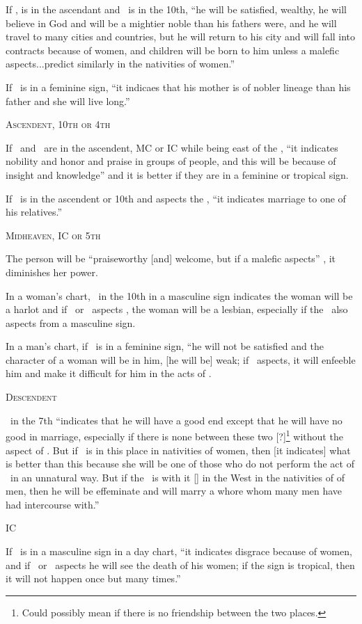 If \Venus, is in the ascendant and \Saturn\, is in the 10th, ``he will be satisfied, wealthy, he will believe in God and will be a mightier noble than his fathers were, and he will travel to many cities and countries, but he will return to his city and will fall into contracts because of women, and children will be born to him unless a malefic aspects...predict similarly in the nativities of women.''

If \Venus\,  is in a feminine sign, ``it indicaes that his mother is of nobler lineage than his father and she will live long.''

\noindent\textsc{Ascendent, 10th or 4th}

If \Venus\, and \Mercury\, are in the ascendent, MC or IC while being east of the \Sun, ``it indicates nobility and honor and praise in groups of people, and this will be because of insight and knowledge'' and it is better if they are in a feminine or tropical sign.

If \Venus\, is in the ascendent or 10th and aspects the \Moon, ``it indicates marriage to one of his relatives.''

\noindent\textsc{Midheaven, IC or 5th}

The person will be ``praiseworthy [and] welcome, but if a malefic aspects'' \Venus, it diminishes her power.

In a woman's chart, \Venus\, in the 10th in a masculine sign indicates the woman will be a harlot and if \Mars\, or \Mercury\, aspects \Venus, the woman will be a lesbian, especially if the \Moon\, also aspects from a masculine sign.

In a man's chart, if \Venus\, is in a feminine sign, ``he will not be satisfied and the character of a woman will be in him, [he will be] weak; if \Saturn\, aspects, it will enfeeble him and make it difficult for him in the acts of \Venus.

\noindent\textsc{Descendent}

\Venus\, in the 7th ``indicates that he will have a good end except that he will have no good in marriage, especially if there is none between these two [?]\footnote{Could possibly mean if there is no friendship between the two places.} without the aspect of \Jupiter. But if \Venus\, is in this place in nativities of women, then [it indicates] what is better than this because she will be one of those who do not perform the act of \Venus\, in an unnatural way. But if the \Moon\, is with it [\Venus] in the West in the nativities of of men, then he will be effeminate and will marry a whore whom many men have had intercourse with.''

\noindent\textsc{IC}

If \Venus\, is in a masculine sign in a day chart, ``it indicates disgrace because of women, and if \Saturn\, or \Mars\, aspects he will see the death of his women; if the sign is tropical, then it will not happen once but many times.''

